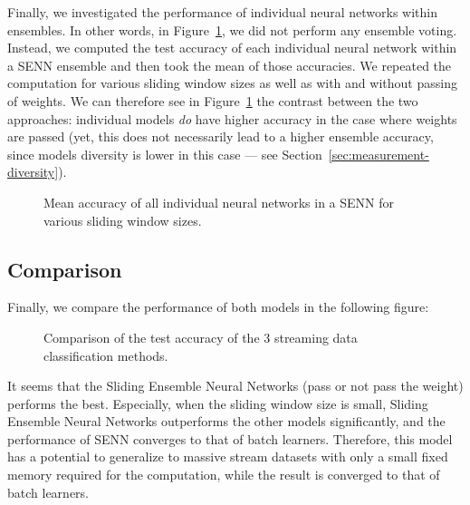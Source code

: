 \documentclass[conference]{IEEEtran}
\begin{document}
		
		
		Finally, we investigated the performance of individual neural networks within ensembles. In other words, in Figure~\ref{fig:mean-accuracy-individual-models}, we did not perform any ensemble voting. Instead, we computed the test accuracy of each individual neural network within a SENN ensemble and then took the mean of those accuracies. We repeated the computation for various sliding window sizes as well as with and without passing of weights. We can therefore see in Figure~\ref{fig:mean-accuracy-individual-models} the contrast between the two approaches: individual models \emph{do} have higher accuracy in the case where weights are passed (yet, this does not necessarily lead to a higher ensemble accuracy, since models diversity is lower in this case --- see Section~\ref{sec:measurement-diversity}).

		\begin{figure}[H]
			\centering
			\caption{Mean accuracy of all individual neural networks in a SENN for various sliding window sizes.}
			\label{fig:mean-accuracy-individual-models}
		\end{figure}
			
			
		\subsection{Comparison} 
		
		Finally, we compare the performance of both models in the following figure:
		\begin{figure}[H]
			\centering
			\caption{Comparison of the test accuracy of the 3 streaming data classification methods.}
			\label{fig:results-trees-ensemble}
		\end{figure}
		It seems that the Sliding Ensemble Neural Networks (pass or not pass the weight) performs the best. Especially, when the sliding window size is small, Sliding Ensemble Neural Networks outperforms  the other models significantly, and the performance of SENN converges to that of batch learners. Therefore, this model has a potential to generalize to massive stream datasets with only a small fixed memory required for the computation, while the result is converged to that of batch learners.
		
\end{document}
